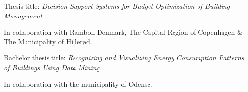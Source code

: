 
Thesis title: \emph{Decision Support Systems for Budget Optimization of Building Management}

In collaboration with Ramboll Denmark, The Capital Region of Copenhagen \& The Municipality of Hillerød.

\divider

Bachelor thesis title: \emph{Recognizing and Visualizing Energy Consumption Patterns of Buildings Using Data Mining}

In collaboration with the municipality of Odense.

\divider